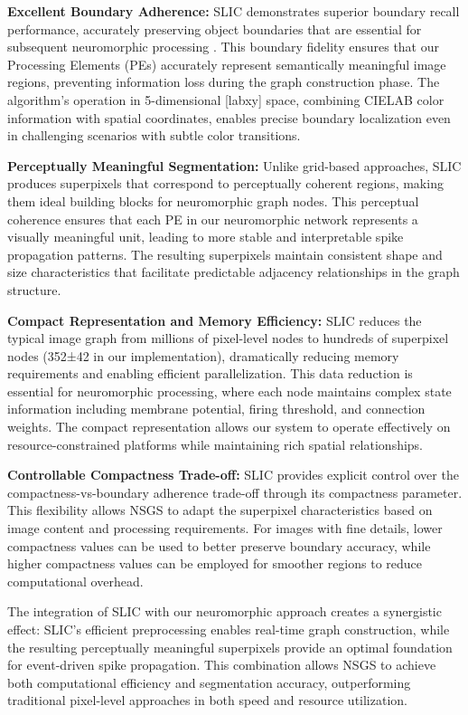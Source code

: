 \documentclass[conference]{IEEEtran}
\begin{document}
\textbf{Excellent Boundary Adherence:} SLIC demonstrates superior boundary recall performance, accurately preserving object boundaries that are essential for subsequent neuromorphic processing \cite{Achanta2012}. This boundary fidelity ensures that our Processing Elements (PEs) accurately represent semantically meaningful image regions, preventing information loss during the graph construction phase. The algorithm's operation in 5-dimensional [labxy] space, combining CIELAB color information with spatial coordinates, enables precise boundary localization even in challenging scenarios with subtle color transitions.

\textbf{Perceptually Meaningful Segmentation:} Unlike grid-based approaches, SLIC produces superpixels that correspond to perceptually coherent regions, making them ideal building blocks for neuromorphic graph nodes. This perceptual coherence ensures that each PE in our neuromorphic network represents a visually meaningful unit, leading to more stable and interpretable spike propagation patterns. The resulting superpixels maintain consistent shape and size characteristics that facilitate predictable adjacency relationships in the graph structure.

\textbf{Compact Representation and Memory Efficiency:} SLIC reduces the typical image graph from millions of pixel-level nodes to hundreds of superpixel nodes (352±42 in our implementation), dramatically reducing memory requirements and enabling efficient parallelization. This data reduction is essential for neuromorphic processing, where each node maintains complex state information including membrane potential, firing threshold, and connection weights. The compact representation allows our system to operate effectively on resource-constrained platforms while maintaining rich spatial relationships.

\textbf{Controllable Compactness Trade-off:} SLIC provides explicit control over the compactness-vs-boundary adherence trade-off through its compactness parameter. This flexibility allows NSGS to adapt the superpixel characteristics based on image content and processing requirements. For images with fine details, lower compactness values can be used to better preserve boundary accuracy, while higher compactness values can be employed for smoother regions to reduce computational overhead.

The integration of SLIC with our neuromorphic approach creates a synergistic effect: SLIC's efficient preprocessing enables real-time graph construction, while the resulting perceptually meaningful superpixels provide an optimal foundation for event-driven spike propagation. This combination allows NSGS to achieve both computational efficiency and segmentation accuracy, outperforming traditional pixel-level approaches in both speed and resource utilization.
\end{document}
